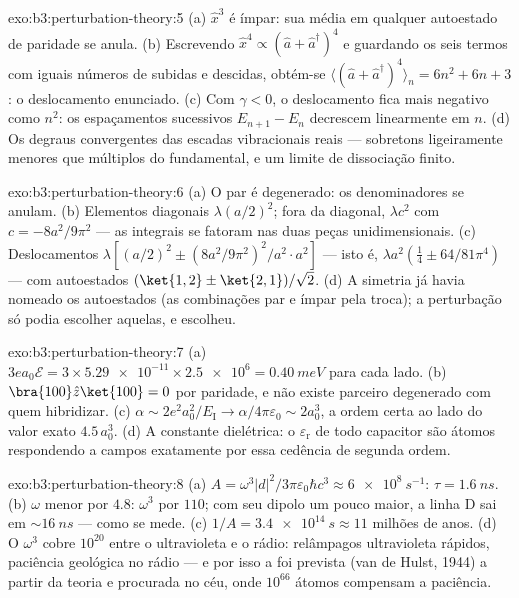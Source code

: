 \begin{solution}{exo:b3:perturbation-theory:5}
(a) $\hat x^3$ é ímpar: sua média em qualquer autoestado de paridade se
anula. (b) Escrevendo $\hat x^4 \propto (\hat a + \hat
a^\dagger)^4$ e guardando os seis termos com iguais números de subidas
e descidas, obtém-se $\langle(\hat a + \hat a^\dagger)^4\rangle_n = 6n^2
+ 6n + 3$: o deslocamento enunciado. (c) Com $\gamma < 0$, o
deslocamento fica mais negativo como $n^2$: os espaçamentos sucessivos
$E_{n+1} - E_n$ decrescem linearmente em $n$. (d) Os degraus
convergentes das escadas vibracionais reais --- sobretons ligeiramente
menores que múltiplos do fundamental, e um limite de dissociação
finito.
\end{solution}

\begin{solution}{exo:b3:perturbation-theory:6}
(a) O par é degenerado: os denominadores se anulam. (b) Elementos
diagonais $\lambda(a/2)^2$; fora da diagonal, $\lambda c^2$ com $c =
-8a^2/9\pi^2$ --- as integrais se fatoram nas duas peças
unidimensionais. (c) Deslocamentos $\lambda[(a/2)^2 \pm
(8a^2/9\pi^2)^2/a^2\cdot a^2]$ --- isto é, $\lambda a^2(\tfrac14 \pm
64/81\pi^4)$ --- com autoestados $(\ket{1,2} \pm \ket{2,1})/
\sqrt2$. (d) A simetria já havia nomeado os autoestados (as combinações
par e ímpar pela troca); a perturbação só podia escolher aquelas, e
escolheu.
\end{solution}

\begin{solution}{exo:b3:perturbation-theory:7}
(a) $3ea_0\mathcal E = 3 \times \num{5.29e-11} \times \num{2.5e6}
= \qty{0.40}{meV}$ para cada lado. (b) $\bra{100}\hat z\ket{100} = 0$
por paridade, e não existe parceiro degenerado com quem hibridizar. (c)
$\alpha \sim 2e^2a_0^2/E_{\text{I}} \to \alpha/4\pi\varepsilon_0
\sim 2a_0^3$, a ordem certa ao lado do valor exato $4.5\,a_0^3$. (d)
A constante dielétrica: o $\varepsilon_{\text{r}}$ de todo capacitor
são átomos respondendo a campos exatamente por essa cedência de segunda
ordem.
\end{solution}

\begin{solution}{exo:b3:perturbation-theory:8}
(a) $A = \omega^3|d|^2/3\pi\varepsilon_0\hbar c^3 \approx
\qty{6e8}{s^{-1}}$: $\tau = \qty{1.6}{ns}$. (b) $\omega$ menor por
$4.8$: $\omega^3$ por $110$; com seu dipolo um pouco maior, a linha D
sai em $\sim\qty{16}{ns}$ --- como se mede. (c)
$1/A = \qty{3.4e14}{s} \approx 11$ milhões de anos. (d) O $\omega^3$
cobre $10^{20}$ entre o ultravioleta e o rádio: relâmpagos ultravioleta
rápidos, paciência geológica no rádio --- e por isso a 
foi prevista (van de Hulst, 1944) a partir da teoria e procurada no
céu, onde $10^{66}$ átomos compensam a paciência.
\end{solution}

